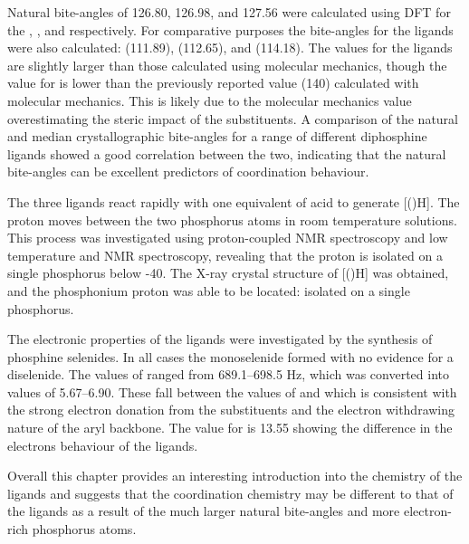 Natural bite-angles of 126.80, 126.98, and 127.56\degrees{} were calculated using DFT for the \tBusixantphos{}, \tButhixantphos, and \tBuxantphos{} respectively.  For comparative purposes the bite-angles for the \Phxantphos{} ligands were also calculated: \Phsixantphos{} (111.89\degrees), \Phthixantphos{} (112.65\degrees), and \Phxantphos{} (114.18\degrees).  The values for the \Phxantphos{} ligands are slightly larger than those calculated using molecular mechanics, though the value for \tBuxantphos{} is lower than the previously reported value (140\degrees) calculated with molecular mechanics.  This is likely due to the molecular mechanics value overestimating the steric impact of the \tBu{} substituents.  A comparison of the natural and median crystallographic bite-angles for a range of different diphosphine ligands showed a good correlation between the two, indicating that the natural bite-angles can be excellent predictors of coordination behaviour.  

The three \tBuxantphos{} ligands react rapidly with one equivalent of acid to generate [(\tBuxantphos)H].  The proton moves between the two phosphorus atoms in room temperature solutions.  This process was investigated using proton-coupled \phosphorus{} NMR spectroscopy and low temperature \proton{} and \phosphorus{} NMR spectroscopy, revealing that the proton is isolated on a single phosphorus below -40\degC.  The X-ray crystal structure of [(\tButhixantphos)H] was obtained, and the phosphonium proton was able to be located: isolated on a single phosphorus.  

The electronic properties of the \tBuxantphos{} ligands were investigated by the synthesis of phosphine selenides.  In all cases the monoselenide formed with no evidence for a diselenide.  The values of \JPSe{} ranged from 689.1--698.5 Hz, which was converted into \pKb{} values of 5.67--6.90.  These fall between the values of  and  which is consistent with the strong electron donation from the \tBu{} substituents and the electron withdrawing nature of the aryl backbone.  The \pKb{} value for \Phxantphos{} is 13.55 showing the difference in the electrons behaviour of the \tBuxantphos{} ligands.

Overall this chapter provides an interesting introduction into the chemistry of the \tBuxantphos{} ligands and suggests that the coordination chemistry may be different to that of the \Phxantphos{} ligands as a result of the much larger natural bite-angles and more electron-rich phosphorus atoms.  














